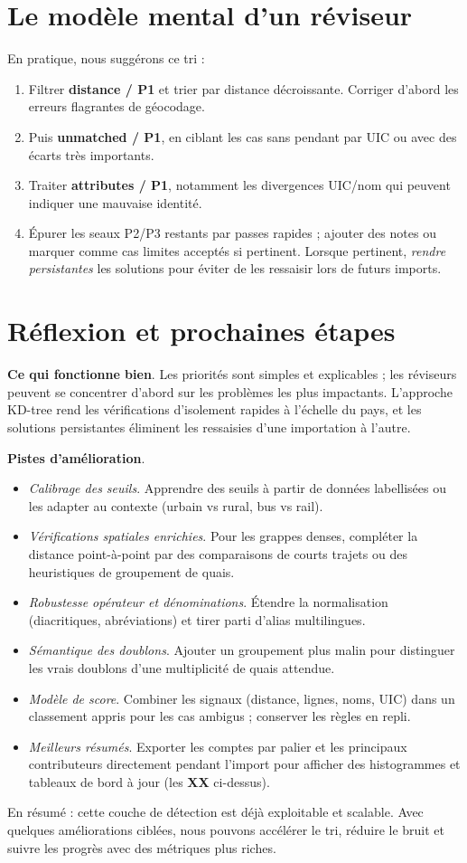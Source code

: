 \section{Le modèle mental d'un réviseur}
En pratique, nous suggérons ce tri :
\begin{enumerate}
  \item Filtrer \textbf{distance / P1} et trier par distance décroissante. Corriger d'abord les erreurs flagrantes de géocodage.
  \item Puis \textbf{unmatched / P1}, en ciblant les cas sans pendant par UIC ou avec des écarts très importants.
  \item Traiter \textbf{attributes / P1}, notamment les divergences UIC/nom qui peuvent indiquer une mauvaise identité.
  \item Épurer les seaux P2/P3 restants par passes rapides ; ajouter des notes ou marquer comme cas limites acceptés si pertinent. Lorsque pertinent, \emph{rendre persistantes} les solutions pour éviter de les ressaisir lors de futurs imports.
\end{enumerate}

\section{Réflexion et prochaines étapes}
\textbf{Ce qui fonctionne bien}. Les priorités sont simples et explicables ; les réviseurs peuvent se concentrer d'abord sur les problèmes les plus impactants. L'approche KD-tree rend les vérifications d'isolement rapides à l'échelle du pays, et les solutions persistantes éliminent les ressaisies d'une importation à l'autre.

\textbf{Pistes d'amélioration}.
\begin{itemize}
  \item \emph{Calibrage des seuils}. Apprendre des seuils à partir de données labellisées ou les adapter au contexte (urbain vs rural, bus vs rail).
  \item \emph{Vérifications spatiales enrichies}. Pour les grappes denses, compléter la distance point-à-point par des comparaisons de courts trajets ou des heuristiques de groupement de quais.
  \item \emph{Robustesse opérateur et dénominations}. Étendre la normalisation (diacritiques, abréviations) et tirer parti d'alias multilingues.
  \item \emph{Sémantique des doublons}. Ajouter un groupement plus malin pour distinguer les vrais doublons d'une multiplicité de quais attendue.
  \item \emph{Modèle de score}. Combiner les signaux (distance, lignes, noms, UIC) dans un classement appris pour les cas ambigus ; conserver les règles en repli.
  \item \emph{Meilleurs résumés}. Exporter les comptes par palier et les principaux contributeurs directement pendant l'import pour afficher des histogrammes et tableaux de bord à jour (les \textbf{XX} ci-dessus).
\end{itemize}

\noindent En résumé : cette couche de détection est déjà exploitable et scalable. Avec quelques améliorations ciblées, nous pouvons accélérer le tri, réduire le bruit et suivre les progrès avec des métriques plus riches.